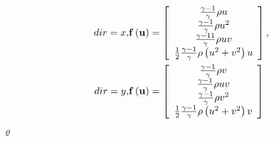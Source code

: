 \documentclass{article}
\begin{document}
\begin{eqnarray} dir = x, & {\bf f}\left({\bf u}\right) = \left[\begin{array}{c} \frac{\gamma-1}{\gamma}\rho u \\ \frac{\gamma-1}{\gamma}\rho u^2 \\ \frac{\gamma-11}{\gamma}\rho u v \\ \frac{1}{2} \frac{\gamma-1}{\gamma}\rho\left(u^2+v^2\right)u \end{array}\right], \\ dir = y, & {\bf f}\left({\bf u}\right) = \left[\begin{array}{c} \frac{\gamma-1}{\gamma}\rho v \\ \frac{\gamma-1}{\gamma}\rho u v \\ \frac{\gamma-1}{\gamma}\rho v^2 \\ \frac{1}{2} \frac{\gamma-1}{\gamma}\rho\left(u^2+v^2\right)v \end{array}\right] \end{eqnarray}
\pagebreak

$\varrho$
\pagebreak
\end{document}
